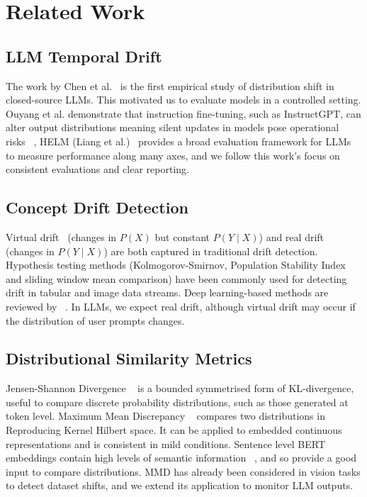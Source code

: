 \documentclass[12pt,a4paper]{article}
\begin{document}
\section{Related Work}
\label{sec:related}

\subsection{LLM Temporal Drift}
The work by Chen et al.~\cite{Chen2023} is the first empirical study of distribution shift in closed-source LLMs. This motivated us to evaluate models in a controlled setting. Ouyang et al. demonstrate that instruction fine-tuning, such as InstructGPT, can alter output distributions meaning silent updates in models pose operational risks~\cite{Ouyang2022} ,  HELM (Liang et al.)~\cite{Liang2022} provides a broad evaluation framework for LLMs to measure performance along many axes, and we follow this work’s focus on consistent evaluations and clear reporting.

\subsection{Concept Drift Detection}
Virtual drift~\cite{Gama2014} (changes in $P(X)$ but constant $P(Y\mid X)$) and real drift (changes in $P(Y\mid X)$) are both captured in traditional drift detection. Hypothesis testing methods (Kolmogorov-Smirnov, Population Stability Index and sliding window mean comparison) have been commonly used for detecting drift in tabular and image data streams. Deep learning-based methods are reviewed by~\cite{Lu2018} . In LLMs, we expect real drift, although virtual drift may occur if the distribution of user prompts changes.




\subsection{Distributional Similarity Metrics}
Jensen-Shannon Divergence ~\cite{Lin1991} is a bounded symmetrised form of KL-divergence, useful to compare discrete probability distributions, such as those generated at token level. Maximum Mean Discrepancy ~\cite{Gretton2012} compares two distributions in Reproducing Kernel Hilbert space. It can be applied to embedded continuous representations and is consistent in mild conditions. Sentence level BERT embeddings contain high levels of semantic information ~\cite{Reimers2019}, and so provide a good input to compare distributions. MMD has already been considered in vision tasks to detect dataset shifts, and we extend its application to monitor LLM outputs.
\end{document}
